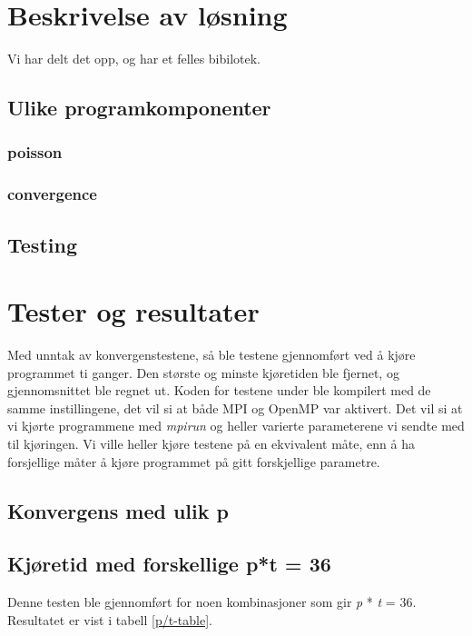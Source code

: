 \documentclass{article}
\begin{document}
\section{Beskrivelse av løsning}
Vi har delt det opp, og har et felles bibilotek.

\subsection{Ulike programkomponenter}
\subsubsection{poisson}
\subsubsection{convergence}

\subsection{Testing}

\section{Tester og resultater}
Med unntak av konvergenstestene, så ble testene gjennomført ved å kjøre programmet ti ganger. Den største og minste kjøretiden ble fjernet, og gjennomsnittet ble regnet ut. Koden for testene under ble kompilert med de samme instillingene, det vil si at både MPI og OpenMP var aktivert. 
Det vil si at vi kjørte programmene med \emph{mpirun} og heller varierte parameterene vi sendte med til kjøringen. Vi ville heller kjøre testene på en ekvivalent måte, enn å ha forsjellige måter å kjøre programmet på gitt forskjellige parametre. 

\subsection{Konvergens med ulik p}

\subsection{Kjøretid med forskellige p*t = 36}
Denne testen ble gjennomført for noen kombinasjoner som gir \emph{p} * \emph{t} = 36. Resultatet er vist i tabell \ref{p/t-table}.
\end{document}

